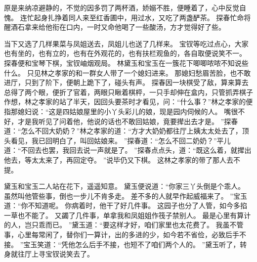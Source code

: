 原是来纳凉避静的，不觉的因多罚了两杯酒，娇嫋不胜，便睡着了，心中反觉自愧。
连忙起身扎挣着同人来至红香圃中，用过水，又吃了两盏酽茶。
探春忙命将醒酒石拿来给他衔在口内，一时又命他喝了一些酸汤，方才觉得好了些。
\par
当下又选了几样果菜与凤姐送去，凤姐儿也送了几样来。
宝钗等吃过点心，大家也有坐的，也有立的，也有在外观花的，也有扶栏观鱼的，各自取便说笑不一。
探春便和宝琴下棋，宝钗岫烟观局。
林黛玉和宝玉在一簇花下唧唧哝哝不知说些什么。
只见林之孝家的和一群女人带了一个媳妇进来。
那媳妇愁眉苦脸，也不敢进厅，只到了阶下，便朝上跪下了，碰头有声。
探春因一块棋受了敌，算来算去总得了两个眼，便折了官着，两眼只瞅着棋枰，一只手却伸在盒内，只管抓弄棋子作想，林之孝家的站了半天，因回头要茶时才看见，问：“什么事？”林之孝家的便指那媳妇说：“这是四姑娘屋里的小丫头彩儿的娘，现是园内伺候的人。
嘴很不好，才是我听见了问着他，他说的话也不敢回姑娘，竟要撵出去才是。
”探春道：“怎么不回大奶奶？”林之孝家的道：“方才大奶奶都往厅上姨太太处去了，顶头看见，我已回明白了，叫回姑娘来。
”探春道：“怎么不回二奶奶？”平儿道：“不回去也罢，我回去说一声就是了。
”探春点点头，道：“既这么着，就撵出他去，等太太来了，再回定夺。
”说毕仍又下棋。
这林之孝家的带了那人去不提。
\par
黛玉和宝玉二人站在花下，遥遥知意。
黛玉便说道：“你家三丫头倒是个乖人。
虽然叫他管些事，倒也一步儿不肯多走。
差不多的人就早作起威福来了。
”宝玉道：“你不知道呢。
你病着时，他干了好几件事。
这园子也分了人管，如今多掐一草也不能了。
又蠲了几件事，单拿我和凤姐姐作筏子禁别人。
最是心里有算计的人，岂只乖而已。
”黛玉道：“要这样才好，咱们家里也太花费了。
我虽不管事，心里每常闲了，替你们一算计，出的多进的少，如今若不省俭，必致后手不接。
”宝玉笑道：“凭他怎么后手不接，也短不了咱们两个人的。
”黛玉听了，转身就往厅上寻宝钗说笑去了。

